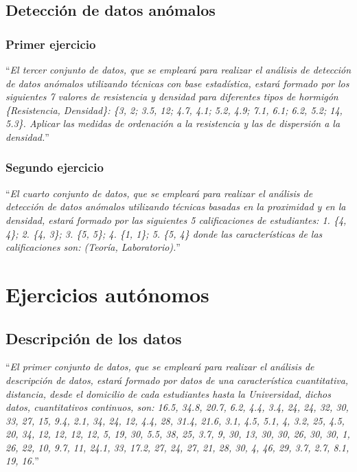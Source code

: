 \documentclass[12pt]{report}\usepackage[]{graphicx}\usepackage[dvipsnames]{xcolor}
\begin{document}
		\section{Detección de datos anómalos}
		
			\subsection{Primer ejercicio}
			
				``\textit{El tercer conjunto de datos, que se empleará para realizar el análisis de detección de datos anómalos utilizando técnicas con base estadística, estará formado por los siguientes 7 valores de resistencia y densidad para diferentes tipos de hormigón \{Resistencia, Densidad\}: \{3, 2; 3.5, 12; 4.7, 4.1; 5.2, 4.9; 7.1, 6.1; 6.2, 5.2; 14, 5.3\}. Aplicar las medidas de ordenación a la resistencia y las de dispersión a la densidad.}''
			
			\subsection{Segundo ejercicio}
			
				``\textit{El cuarto conjunto de datos, que se empleará para realizar el análisis de detección de datos anómalos utilizando técnicas basadas en la proximidad y en la densidad, estará formado por las siguientes 5 calificaciones de estudiantes: 1. \{4, 4\}; 2. \{4, 3\}; 3. \{5, 5\}; 4. \{1, 1\}; 5. \{5, 4\} donde las características de las calificaciones son: (Teoría, Laboratorio).}''
	
	\chapter{Ejercicios autónomos}
	
		\section{Descripción de los datos}
		
			``\textit{El primer conjunto de datos, que se empleará para realizar el análisis de descripción de datos, estará formado por datos de una característica cuantitativa, distancia, desde el domicilio de cada estudiantes hasta la Universidad, dichos datos, cuantitativos continuos, son: 16.5, 34.8, 20.7, 6.2, 4.4, 3.4, 24, 24, 32, 30, 33, 27, 15, 9.4, 2.1, 34, 24, 12, 4.4, 28, 31.4, 21.6, 3.1, 4.5, 5.1, 4, 3.2, 25, 4.5, 20, 34, 12, 12, 12, 12, 5, 19, 30, 5.5, 38, 25, 3.7, 9, 30, 13, 30, 30, 26, 30, 30, 1, 26, 22, 10, 9.7, 11, 24.1, 33, 17.2, 27, 24, 27, 21, 28, 30, 4, 46, 29, 3.7, 2.7, 8.1, 19, 16.}''
		
\end{document}
